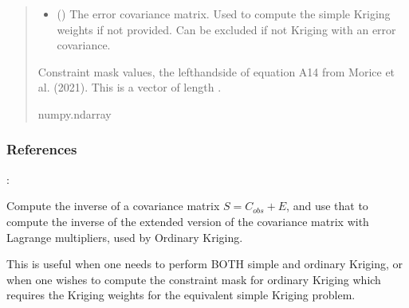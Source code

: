 \documentclass[letterpaper,10pt,english]{sphinxmanual}
\begin{document}
\begin{fulllineitems}
\begin{fulllineitems}
\begin{quote}
\begin{description}
\begin{itemize}
\item {}
\sphinxAtStartPar
{} (\sphinxstyleliteralemphasis{\sphinxupquote{ | }}\sphinxstyleliteralemphasis{\sphinxupquote{,}}) \textendash{} The error covariance matrix. Used to compute the simple Kriging
weights if not provided. Can be excluded if not Kriging with an
error covariance.

\end{itemize}

\sphinxAtStartPar
{} \textendash{} Constraint mask values, the left\sphinxhyphen{}hand\sphinxhyphen{}side of equation A14 from
Morice et al. (2021). This is a vector of length .

\sphinxAtStartPar
numpy.ndarray

\end{description}\end{quote}
\subsubsection*{References}

\sphinxAtStartPar
{}: 

\end{fulllineitems}


\begin{fulllineitems}
\label{\detokenize{kriging:glomar_gridding.kriging.OrdinaryKriging.extended_inverse}}
\pysigstartsignatures
\pysiglinewithargsret
{}
{}
{}
\pysigstopsignatures
\sphinxAtStartPar
Compute the inverse of a covariance matrix \(S = C_{obs} + E\), and
use that to compute the inverse of the extended version of the
covariance matrix with Lagrange multipliers, used by Ordinary Kriging.

\sphinxAtStartPar
This is useful when one needs to perform BOTH simple and ordinary
Kriging, or when one wishes to compute the constraint mask for
ordinary Kriging which requires the Kriging weights for the equivalent
simple Kriging problem.


\end{fulllineitems}
\end{fulllineitems}
\end{document}
